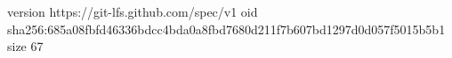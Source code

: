 version https://git-lfs.github.com/spec/v1
oid sha256:685a08fbfd46336bdcc4bda0a8fbd7680d211f7b607bd1297d0d057f5015b5b1
size 67

